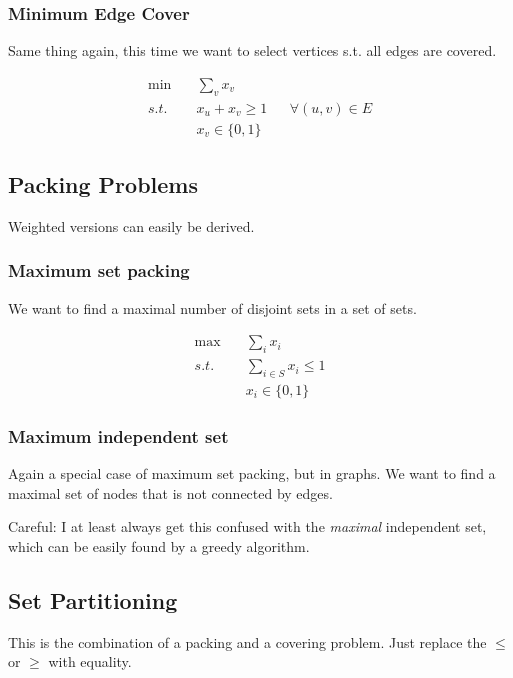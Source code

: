 \subsubsection{Minimum Edge Cover}

Same thing again, this time we want to select vertices s.t. all edges are covered.

\begin{align*}
\min \quad & \sum_v x_v \\
s.t. \quad & x_u+x_v \geq 1 && \forall (u,v) \in E\\
	& x_v \in \{0,1\}
\end{align*}

\subsection{Packing Problems}

Weighted versions can easily be derived.

\subsubsection{Maximum set packing}
We want to find a maximal number of disjoint sets in a set of sets.

\begin{align*}
\max \quad & \sum_{i} x_i\\
s.t. \quad & \sum_{i\in S} x_i \leq 1\\
	& x_i \in \{0,1\}
\end{align*}
\subsubsection{Maximum independent set}

Again a special case of maximum set packing, but in graphs. We want to find a maximal set of nodes that is not connected by edges.

Careful: I at least always get this confused with the \emph{maximal} independent set, which can be easily found by a greedy algorithm.
\subsection{Set Partitioning}
This is the combination of a packing and a covering problem. Just replace the $\leq$ or $\geq$ with equality.